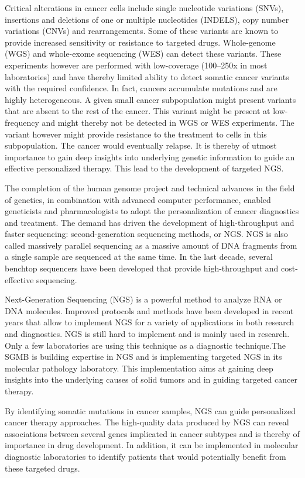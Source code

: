 Critical alterations in cancer cells include single nucleotide variations
(SNVs), insertions and deletions of one or multiple nucleotides (INDELS), copy
number variations (CNVs) and rearrangements. Some of these variants are known to
provide increased sensitivity or resistance to targeted drugs. Whole-genome
(WGS) and whole-exome sequencing (WES) can detect these variants. These
experiments however are performed with low-coverage (100--250x in most
laboratories) and have thereby limited ability to detect somatic cancer variants
with the required confidence. In fact, cancers accumulate mutations and are
highly heterogeneous. A given small cancer subpopulation might present variants
that are absent to the rest of the cancer. This variant might be present at
low-frequency and might thereby not be detected in WGS or WES experiments. The
variant however might provide resistance to the treatment to cells in this
subpopulation. The cancer would eventually relapse. It is thereby of utmost
importance to gain deep insights into underlying genetic information to guide an
effective personalized therapy. This lead to the development of targeted NGS.

The completion of the human genome project and technical advances in the field
of genetics, in combination with advanced computer performance, enabled
geneticists and pharmacologists to adopt the personalization of cancer
diagnostics and treatment. The demand has driven the development of
high-throughput and faster sequencing: second-generation sequencing methods, or
NGS. NGS is also called massively parallel sequencing as a massive amount of DNA
fragments from a single sample are sequenced at the same time. In the last
decade, several benchtop sequencers have been developed that provide
high-throughput and cost-effective sequencing.

Next-Generation Sequencing (NGS) is a powerful method to analyze RNA or DNA
molecules. Improved protocols and methods have been developed in recent years
that allow to implement NGS for a variety of applications in both research and
diagnostics. NGS is still hard to implement and is mainly used in research. Only
a few laboratories are using this technique as a diagnostic technique.The SGMB
is building expertise in NGS and is implementing targeted NGS in its molecular
pathology laboratory. This implementation aims at gaining deep insights into the
underlying causes of solid tumors and in guiding targeted cancer therapy.

By identifying somatic mutations in cancer samples, NGS can guide personalized
cancer therapy approaches. The high-quality data produced by NGS can reveal
associations between several genes implicated in cancer subtypes and is thereby
of importance in drug development. In addition, it can be implemented in
molecular diagnostic laboratories to identify patients that would potentially
benefit from these targeted drugs.

